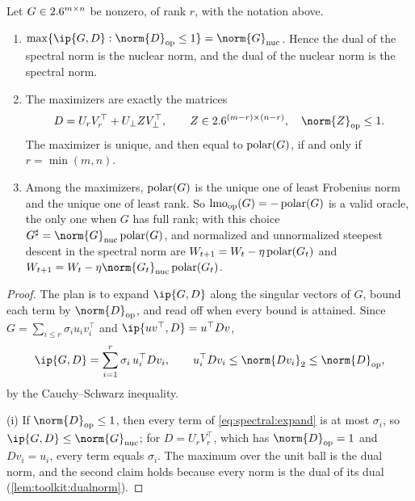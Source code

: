 \begin{refsection}
\begin{theorem}\label{thm:spectral:lmo}
Let $G\in2.6^{m\times n}$ be nonzero, of rank $r$, with the notation above.
\begin{enumerate}
\item $\max\{\ip{G,D}:\norm{D}_{\op}\le1\}=\norm{G}_{\nuc}$. Hence the dual of the spectral norm is the nuclear norm, and the dual of the nuclear norm is the spectral norm.
\item The maximizers are exactly the matrices
\begin{equation}\label{eq:spectral:face}
  D=U_rV_r^\top+U_\perp ZV_\perp^\top,\qquad Z\in\R^{(m-r)\times(n-r)},\quad\norm{Z}_{\op}\le1 .
\end{equation}
The maximizer is unique, and then equal to $\operatorname{polar}(G)$, if and only if $r=\min(m,n)$.
\item Among the maximizers, $\operatorname{polar}(G)$ is the unique one of least Frobenius norm and the unique one of least rank. So $\operatorname{lmo}_{\mathrm{op}}(G)=-\operatorname{polar}(G)$ is a valid oracle, the only one when $G$ has full rank; with this choice $G^\sharp=\norm{G}_{\nuc}\polar(G)$, and normalized and unnormalized steepest descent in the spectral norm are $W_{t+1}=W_t-\eta\operatorname{polar}(G_t)$ and $W_{t+1}=W_t-\eta\norm{G_t}_{\nuc}\polar(G_t)$.
\end{enumerate}
\end{theorem}

\begin{proof}
The plan is to expand $\ip{G,D}$ along the singular vectors of $G$, bound each term by $\norm{D}_{\op}$, and read off when every bound is attained. Since $G=\sum_{i\le r}\sigma_iu_iv_i^\top$ and $\ip{uv^\top,D}=u^\top Dv$,
\begin{equation}\label{eq:spectral:expand}
  \ip{G,D}=\sum_{i=1}^r\sigma_i\,u_i^\top Dv_i ,\qquad u_i^\top Dv_i\le\norm{Dv_i}_2\le\norm{D}_{\op},
\end{equation}
by the Cauchy--Schwarz inequality.

(i) If $\norm{D}_{\op}\le1$, then every term of \eqref{eq:spectral:expand} is at most $\sigma_i$, so $\ip{G,D}\le\norm{G}_{\nuc}$; for $D=U_rV_r^\top$, which has $\norm{D}_{\op}=1$ and $Dv_i=u_i$, every term equals $\sigma_i$. The maximum over the unit ball is the dual norm, and the second claim holds because every norm is the dual of its dual (\cref{lem:toolkit:dualnorm}).


\end{proof}
\end{refsection}
